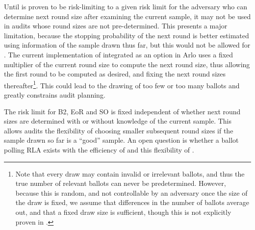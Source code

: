 Until \Minerva is proven to be risk-limiting to a given risk limit for the adversary who can determine next round size after examining the current sample, it may not be used in audits whose round sizes are not pre-determined. This presents a major limitation, because the stopping probability of the next round is better estimated using information of the sample drawn thus far, but this would not be allowed for \Minerva. The current implementation of \Minerva integrated as an option in Arlo uses a fixed multiplier of the current round size to compute the next round size, thus allowing the first round to be computed as desired, and fixing the next round sizes thereafter\footnote{Note that every draw may contain invalid or irrelevant ballots, and thus the true number of relevant ballots can never be predetermined. However, because this is random, and not controllable by an adversary once the size of the draw is fixed, we assume that differences in the number of ballots average out, and that a fixed draw size is sufficient, though this is not explicitly proven in \cite{usenix_minerva}.}. This could lead to the drawing of too few or too many ballots and greatly constrains audit planning.  


The risk limit for B2, EoR and SO \BRAVO is fixed independent of whether next round sizes are determined with or without knowledge of the current sample. This allows \BRAVO audits the flexibility of choosing smaller subsequent round sizes if the sample drawn so far is a ``good'' sample. An open question is whether a ballot polling RLA exists with the efficiency of \Minerva and this flexibility of \BRAVO.

